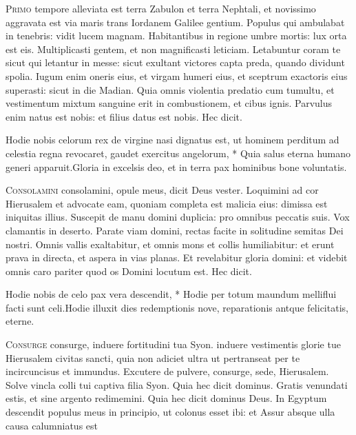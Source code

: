 \begin{multicols*}{2}
\lettrine[lines=2]{\zallmancaps \color{Red} P}{rimo} tempore alleviata est terra Zabulon et terra Nephtali, et novissimo aggravata est via maris trans Iordanem Galilee gentium. Populus qui ambulabat in tenebris: vidit lucem magnam. Habitantibus in regione umbre mortis: lux orta est eis. Multiplicasti gentem, et non magnificasti leticiam. Letabuntur coram te sicut qui letantur in messe: sicut exultant victores capta preda, quando dividunt spolia. Iugum enim oneris eius, et virgam humeri eius, et sceptrum exactoris eius superasti: sicut in die Madian. Quia omnis violentia predatio cum tumultu, et vestimentum mixtum sanguine erit in combustionem, et cibus ignis. Parvulus enim natus est nobis: et filius datus est nobis. Hec dicit.
\begin{responsory}
{Hodie nobis celorum rex de virgine nasi dignatus est, ut hominem perditum ad celestia regna revocaret, gaudet exercitus angelorum, * Quia salus eterna humano generi apparuit.}{Gloria in excelsis deo, et in terra pax hominibus bone voluntatis.}
\end{responsory}
\lettrine[lines=2]{\zallmancaps \color{Blue} C}{onsolamini} consolamini, opule meus, dicit Deus vester. Loquimini ad cor Hierusalem et advocate eam, quoniam completa est malicia eius: dimissa est iniquitas illius. Suscepit de manu domini duplicia: pro omnibus peccatis suis. Vox clamantis in deserto. Parate viam domini, rectas facite in solitudine semitas Dei nostri. Omnis vallis exaltabitur, et omnis mons et collis humiliabitur: et erunt prava in directa, et aspera in vias planas. Et revelabitur gloria domini: et videbit omnis caro pariter quod os Domini locutum est. Hec dicit.
\begin{responsory}
{Hodie nobis de celo pax vera descendit, * Hodie per totum maundum melliflui facti sunt celi.}{Hodie illuxit dies redemptionis nove, reparationis antque felicitatis, eterne.}
\end{responsory}
\lettrine[lines=2]{\zallmancaps \color{Red} C}{onsurge} consurge, induere fortitudini tua Syon. induere vestimentis glorie tue Hierusalem civitas sancti, quia non adiciet ultra ut pertranseat per te incircuncisus et immundus. Excutere de pulvere, consurge, sede, Hierusalem. Solve vincla colli tui captiva filia Syon. Quia hec dicit dominus. Gratis venundati estis, et sine argento redimemini. Quia hec dicit dominus Deus. In Egyptum descendit populus meus in principio, ut colonus esset ibi: et Assur absque ulla causa calumniatus est

\end{multicols*}

